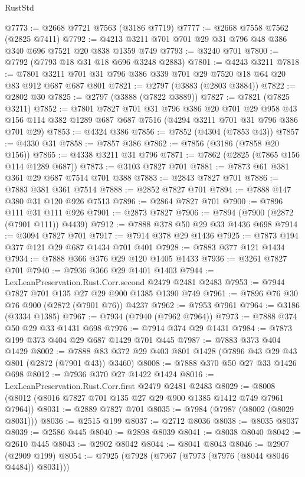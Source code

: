 \begin{lexlean}{RustStd}
\begin{coremodule}
{\begin{coremodule}
{{{{{{{{{{{{{{{{{{{{@7773 := @2668 @7721 @7563 (@3186 @7719)
@7777 := @2668 @7558 @7562 (@2825 @7411)
@7792 := @4213 @3211 @701 @701 @29 @31 @796 @48 @386 @340 @696 @7521 @20 @838 @1359 @749
@7793 := @3240 @701
@7800 := @7792 (@7793 @18 @31 @18 @696 @3248 @2883)
@7801 := @4243 @3211
@7818 := @7801 @3211 @701 @31 @796 @386 @339 @701 @29 @7520 @18 @64 @20 @83 @912 @687 @687 @801
@7821 := @2797 (@3883 (@2803 @3884))
@7822 := @2802 @30
@7825 := @2797 (@3888 (@7822 @3889))
@7827 := @7821 (@7825 @3211)
@7852 := @7801
    @7827
    @701
    @31
    @796
    @386
    @20
    @701
    @29
    @958
    @43
    @156
    @114
    @382
    @1289
    @687
    @687
    @7516
    (@4294 @3211 @701 @31 @796 @386 @701 @29)
@7853 := @4324 @386
@7856 := @7852 (@4304 (@7853 @43))
@7857 := @4330 @31
@7858 := @7857 @386
@7862 := @7856 (@3186 (@7858 @20 @156))
@7865 := @4338 @3211 @31 @796
@7871 := @7862 (@2825 (@7865 @156 @114 @1289 @687))
@7873 := @3103 @7827 @701
@7881 := @7873 @61 @381 @361 @29 @687 @7514 @701 @388
@7883 := @2843 @7827 @701
@7886 := @7883 @381 @361 @7514
@7888 := @2852 @7827 @701
@7894 := @7888 @147 @380 @31 @120 @926 @7513
@7896 := @2864 @7827 @701
@7900 := @7896 @111 @31 @111 @926
@7901 := @2873 @7827
@7906 := @7894 (@7900 (@2872 (@7901 @111)) @4439)
@7912 := @7888 @378 @50 @29 @33 @1436 @698
@7914 := @3094 @7827 @701
@7917 := @7914 @378 @29 @1436
@7925 := @7873 @194 @377 @121 @29 @687 @1434 @701 @401
@7928 := @7883 @377 @121 @1434
@7934 := @7888 @366 @376 @29 @120 @1405 @1433
@7936 := @3261 @7827 @701
@7940 := @7936 @366 @29 @1401 @1403
@7944 := LexLeanPreservation.Rust.Corr.second @2479 @2481 @2483
@7953 := @7944 @7827 @701 @135 @27 @29 @900 @1385 @1390 @749
@7961 := @7896 @76 @30 @76 @900 (@2872 (@7901 @76)) @4237
@7962 := @7953 @7961
@7964 := @3186 (@3334 @1385)
@7967 := @7934 (@7940 (@7962 @7964))
@7973 := @7888 @374 @50 @29 @33 @1431 @698
@7976 := @7914 @374 @29 @1431
@7984 := @7873 @199 @373 @404 @29 @687 @1429 @701 @445
@7987 := @7883 @373 @404 @1429
@8002 := @7888 @83 @372 @29 @403 @801 @1428 (@7896 @43 @29 @43 @801 (@2872 (@7901 @43)) @3460)
@8008 := @7888 @370 @50 @27 @33 @1426 @698
@8012 := @7936 @370 @27 @1422 @1424
@8016 := LexLeanPreservation.Rust.Corr.first @2479 @2481 @2483
@8029 := @8008 (@8012 (@8016 @7827 @701 @135 @27 @29 @900 @1385 @1412 @749 @7961 @7964))
@8031 := @2889 @7827 @701
@8035 := @7984 (@7987 (@8002 (@8029 @8031)))
@8036 := @2515 @199
@8037 := @2712 @8036
@8038 := @8035 @8037
@8039 := @2586 @445
@8040 := @2898 @8039
@8041 := @8038 @8040
@8042 := @2610 @445
@8043 := @2902 @8042
@8044 := @8041 @8043
@8046 := @2907 (@2909 @199)
@8054 := @7925 (@7928 (@7967 (@7973 (@7976 (@8044 @8046 @4484)) @8031)))
}}}}}}}}}}}}}}}}}}}}
\end{coremodule}}
\end{coremodule}
\end{lexlean}
